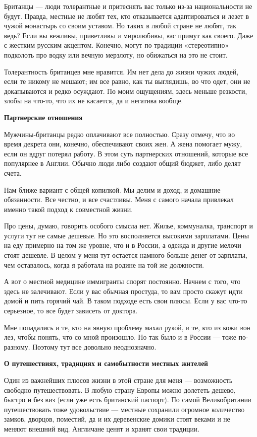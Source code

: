 Британцы — люди толерантные и притеснять вас только из-за национальности не будут. Правда, местные не любят тех, кто отказывается адаптироваться и лезет в чужой монастырь со своим уставом. Но таких в любой стране не любят, так ведь? Если вы вежливы, приветливы и миролюбивы, вас примут как своего. Даже с жестким русским акцентом. Конечно, могут по традиции «стереотипно» подколоть про водку или вечную мерзлоту, но обижаться на это не стоит.

Толерантность британцев мне нравится. Им нет дела до жизни чужих людей, если те никому не мешают; им все равно, как ты выглядишь, во что одет, они не докапываются и редко осуждают. По моим ощущениям, здесь меньше резкости, злобы на что-то, что их не касается, да и негатива вообще.

\textbf{Партнерские отношения}

Мужчины-британцы редко оплачивают все полностью. Сразу отмечу, что во время декрета они, конечно, обеспечивают своих жен. А жена помогает мужу, если он вдруг потерял работу. В этом суть партнерских отношений, которые все популярнее в Англии. Обычно люди либо создают общий бюджет, либо делят счета.

Нам ближе вариант с общей копилкой. Мы делим и доход, и домашние обязанности. Все честно, и все счастливы. Меня с самого начала привлекал именно такой подход к совместной жизни.

Про цены, думаю, говорить особого смысла нет. Жилье, коммуналка, транспорт и услуги тут не самые дешевые. Но это восполняется высокими зарплатами. Цены на еду примерно на том же уровне, что и в России, а одежда и другие мелочи стоят дешевле. В целом у меня тут остается намного больше денег от зарплаты, чем оставалось, когда я работала на родине на той же должности.

А вот о местной медицине иммигранты спорят постоянно. Начнем с того, что здесь не залечивают. Если у вас обычная простуда, то вам просто скажут идти домой и пить горячий чай. В таком подходе есть свои плюсы. Если у вас что-то серьезное, то все будет зависеть от доктора.

Мне попадались и те, кто на явную проблему махал рукой, и те, кто из кожи вон лез, чтобы понять, что со мной произошло. Но так было и в России — тоже по-разному. Поэтому тут все довольно неоднозначно.

\textbf{О путешествиях, традициях и самобытности местных жителей}

Один из важнейших плюсов жизни в этой стране для меня — возможность свободно путешествовать. В любую страну Европы можно долететь дешево, быстро и без виз (если уже есть британский паспорт). По самой Великобритании путешествовать тоже удовольствие — местные сохранили огромное количество замков, дворцов, поместий, да и их деревенские домики стоят веками и не меняют внешний вид. Англичане ценят и хранят свои традиции.

